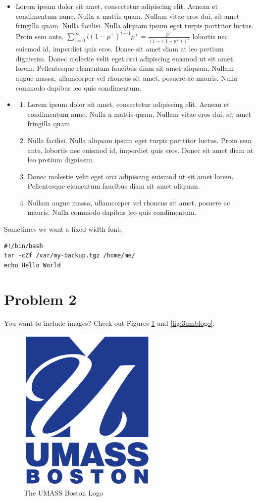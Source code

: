 \documentclass[12pt,letterpaper]{article}
\begin{document}
\begin{itemize}
  \item Lorem ipsum dolor sit amet, consectetur adipiscing elit. Aenean et
  condimentum nunc. Nulla a mattis quam. Nullam vitae eros dui, sit amet
  fringilla quam. Nulla facilisi. Nulla aliquam ipsum eget turpis porttitor
  luctus. Proin sem ante, $\sum_{i=0}^\infty
  i(1-p^+)^{i-1}p^+ = \frac{p^+}{(1-(1-p^+))^2}$ lobortis nec euismod id,
  imperdiet quis eros. Donec sit amet diam at leo pretium dignissim. Donec molestie velit eget orci
  adipiscing euismod ut sit amet lorem. Pellentesque elementum faucibus diam sit
  amet aliquam. Nullam augue massa, ullamcorper vel rhoncus sit amet, posuere ac
  mauris. Nulla commodo dapibus leo quis condimentum.
  \item \begin{enumerate}
    \item Lorem ipsum dolor sit amet, consectetur adipiscing
	elit.  Aenean et condimentum nunc. Nulla a mattis quam. Nullam vitae eros dui,
	sit amet fringilla quam. 
	\item Nulla facilisi. Nulla aliquam ipsum eget turpis
	porttitor luctus. Proin sem ante, lobortis nec euismod id, imperdiet quis eros.
	Donec sit amet diam at leo pretium dignissim. 
	\item Donec molestie velit eget orci
	adipiscing euismod ut sit amet lorem. Pellentesque elementum faucibus diam sit
	amet aliquam. 
	\item Nullam augue massa, ullamcorper vel rhoncus sit amet, posuere ac
	mauris. Nulla commodo dapibus leo quis condimentum.
  \end{enumerate}
\end{itemize}

Sometimes we want a fixed width font:

\begin{verbatim}
#!/bin/bash          
tar -cZf /var/my-backup.tgz /home/me/
echo Hello World   
\end{verbatim}


\newpage
\section*{Problem 2}

You want to include images? Check out Figures \ref{fig:umblogo} and
\ref{fig:3umblogo}.

\begin{figure}[h]
\begin{center}
\includegraphics[width=.2\textwidth]{umass-boston-logo.png}
\caption{The UMASS Boston Logo}
\label{fig:umblogo}
\end{center}
\end{figure} 
\end{document}
